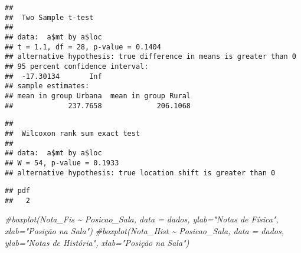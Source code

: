 \documentclass[
]{article}
\newenvironment{Shaded}{\begin{snugshade}}{\end{snugshade}}
\newcommand{\AttributeTok}[1]{\textcolor[rgb]{0.77,0.63,0.00}{#1}}
\newcommand{\CommentTok}[1]{\textcolor[rgb]{0.56,0.35,0.01}{\textit{#1}}}
\newcommand{\FunctionTok}[1]{\textcolor[rgb]{0.00,0.00,0.00}{#1}}
\newcommand{\NormalTok}[1]{#1}
\newcommand{\SpecialCharTok}[1]{\textcolor[rgb]{0.00,0.00,0.00}{#1}}
\newcommand{\StringTok}[1]{\textcolor[rgb]{0.31,0.60,0.02}{#1}}
\begin{document}
\begin{verbatim}
## 
##  Two Sample t-test
## 
## data:  a$mt by a$loc
## t = 1.1, df = 28, p-value = 0.1404
## alternative hypothesis: true difference in means is greater than 0
## 95 percent confidence interval:
##  -17.30134       Inf
## sample estimates:
## mean in group Urbana  mean in group Rural 
##             237.7658             206.1068
\end{verbatim}

\begin{Shaded}
\end{Shaded}

\begin{verbatim}
## 
##  Wilcoxon rank sum exact test
## 
## data:  a$mt by a$loc
## W = 54, p-value = 0.1933
## alternative hypothesis: true location shift is greater than 0
\end{verbatim}

\begin{Shaded}
\end{Shaded}

\begin{verbatim}
## pdf 
##   2
\end{verbatim}

\begin{Shaded}
\begin{Highlighting}[]
\CommentTok{\#boxplot(Nota\_Fis \textasciitilde{} Posicao\_Sala, data = dados, ylab="Notas de Física", xlab="Posição na Sala")}
\CommentTok{\#boxplot(Nota\_Hist \textasciitilde{} Posicao\_Sala, data = dados, ylab="Notas de História", xlab="Posição na Sala")}
\end{Highlighting}
\end{Shaded}
\end{document}
